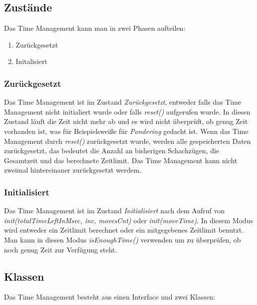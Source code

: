 \subsection{Zust\"ande}
Das Time Management kann man in zwei Phasen aufteilen: 
\begin{enumerate}
    \item{Zur\"uckgesetzt}
    \item{Initalisiert}
\end{enumerate}

\subsubsection{Zur\"uckgesetzt}
Das Time Management ist im Zustand \textit{Zur\"uckgesetzt}, entweder falls das Time Management nicht initialiert wurde oder falls \textit{reset()} aufgerufen wurde. In diesen Zustand l\"auft die Zeit nicht mehr ab und es wird nicht \"uberpr\"uft, ob genug Zeit vorhanden ist, was f\"ur Beispielsweiße f\"ur \textit{Pondering} gedacht ist.
\newline Wenn das Time Management durch \textit{reset()} zur\"uckgesetzt wurde, werden alle gespeicherten Daten zur\"uckgesetzt, das bedeutet die Anzahl an bisherigen Schachz\"ugen, die Gesamtzeit und das berechnete Zeitlimit. 
\newline Das Time Management kann nicht zweimal hintereinaner zur\"uckgesetzt werdem.

\subsubsection{Initialisiert}
Das Time Management ist im Zustand \textit{Initialisiert} nach dem Aufruf von \textit{init(totalTimeLeftInMsec, inc, movesCnt)} oder \textit{init(moveTime)}.\newline
In diesem Modus wird entweder ein Zeitlimit berechnet oder ein mitgegebenes Zeitlimit benutzt. Man kann in diesen Modus \textit{isEnoughTime()} verwenden um zu \"uberpr\"ufen, ob noch genug Zeit zur Verfügung steht.

\subsection{Klassen}
Das Time Management besteht aus einen Interface und zwei Klassen:
